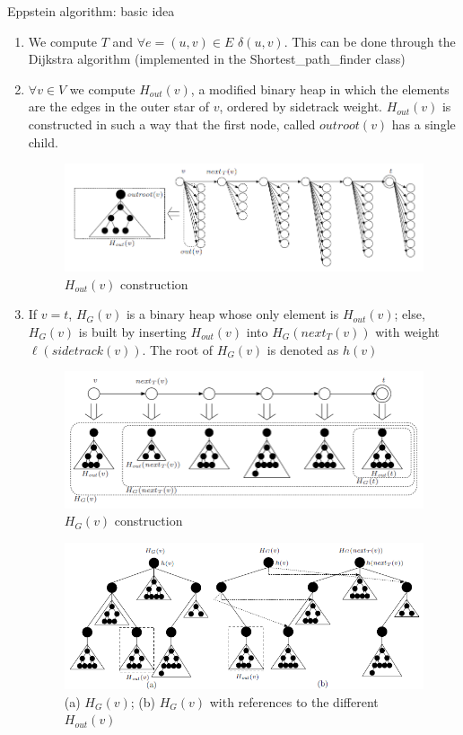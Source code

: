 \begin{frame}[allowframebreaks]{Eppstein algorithm: basic idea}
    \begin{enumerate}
        \item We compute $T$ and $\forall e=(u,v) \in E$ $\delta(u,v)$. This can be done through the Dijkstra algorithm (implemented in the Shortest\_path\_finder class)
        \item $\forall v \in V$ we compute $H_{out}(v)$, a modified binary heap in which the elements are the edges in the outer star of $v$, ordered by sidetrack weight. $H_{out}(v)$ is constructed in such a way that the first node, called $outroot(v)$ has a single child.
        
        \begin{figure}
            \centering
            \includegraphics[width=0.7\linewidth]{Img/k_finder/h_out.PNG}
            \caption{$H_{out}(v)$ construction}
        \end{figure}
        
        \framebreak
        
        \item If $v=t$, $H_G(v)$ is a binary heap whose only element is $H_{out}(v)$; else, $H_G(v)$ is built by inserting $H_{out}(v)$ into $H_G(next_T(v))$ with weight $\ell(sidetrack(v))$. The root of $H_G(v)$ is denoted as $h(v)$
        
        \begin{figure}
            \centering
            \includegraphics[width=0.7\linewidth]{Img/k_finder/h_g.PNG}
            \caption{$H_{G}(v)$ construction}
        \end{figure}
        
        \framebreak
        
        \begin{figure}
            \centering
            \includegraphics[width=0.7\linewidth]{Img/k_finder/h_out_h_g.PNG}
            \caption{(a) $H_G(v)$; (b) $H_G(v)$ with references to the different $H_{out}(v)$}
        \end{figure}
        

\end{enumerate}
\end{frame}
